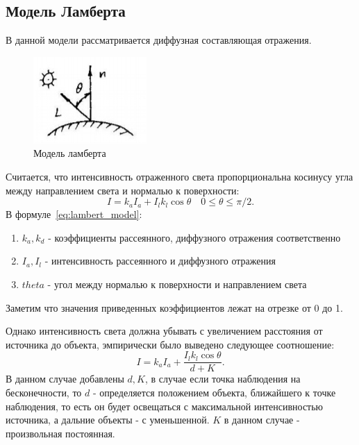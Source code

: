 \documentclass[a4paper,14pt,unknownkeysallowed]{extreport}
\begin{document}
\subsection{Модель Ламберта}
В данной модели рассматривается диффузная составляющая отражения.

\begin{figure}[h]
	\centering
	\includegraphics{lambert_model}
	\caption{Модель ламберта}
	\label{fig:lambert_model}
\end{figure}

Считается, что интенсивность отраженного света
пропорциональна косинусу угла между направлением света и нормалью к поверхности:
\begin{equation} 
	I = k_aI_a + I_lk_l\cos\theta \quad 0 \leq \theta \leq \pi/2.
	\label{eq:lambert_model}
\end{equation}
В  формуле~\ref{eq:lambert_model}:
\begin{enumerate}
	\item $k_a,k_d$ - коэффициенты рассеянного, диффузного отражения соответственно
	\item $I_a,I_l$ - интенсивность рассеянного и диффузного отражения 
	\item $theta$ - угол между нормалью к поверхности и направлением света
\end{enumerate}
Заметим что значения приведенных коэффициентов лежат на отрезке от 0 до 1.

Однако интенсивность света должна убывать с увеличением расстояния от источника до объекта, эмпирически было выведено следующее соотношение:
\begin{equation} 
	I = k_aI_a + \frac{I_lk_l\cos\theta}{d + K}.
	\label{eq:lambert_model_space}
\end{equation}
В данном случае добавлены $d,K$, в случае если точка наблюдения на бесконечности, то $d$ - определяется положением объекта,
ближайшего к точке наблюдения, то есть он будет освещаться с максимальной интенсивностью источника, а дальние объекты - с уменьшенной.
$K$ в данном случае - произвольная постоянная. \cite{Rodgers}
\end{document}
